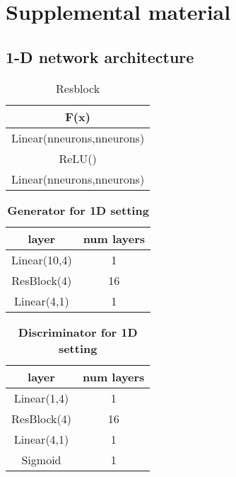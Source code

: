 
\section*{Supplemental material}

\subsection{1-D network architecture}

\begin{table}[ht]
\caption{Resblock} %
\centering %
\begin{tabular}{c} %
\hline\hline %
F(x)\\%
\hline %
Linear(nneurons,nneurons)\\ %
ReLU() \\
Linear(nneurons,nneurons) \\
\hline %
\end{tabular}
\label{table:resblock} %
\end{table}


\begin{table}[ht]
\caption{\textbf{Generator for 1D setting}} %
\centering %
\begin{tabular}{c c} %
\hline\hline %
layer & num layers\\%
\hline %
Linear(10,4) & 1\\ %
ResBlock(4) & 16 \\
Linear(4,1) & 1 \\
\hline %
\end{tabular}
\label{table:1d_G} %
\end{table}

\begin{table}[ht]
\caption{\textbf{Discriminator for 1D setting}} %
\centering %
\begin{tabular}{c c} %
\hline\hline %
layer & num layers\\%
\hline %
Linear(1,4) & 1\\ %
ResBlock(4) & 16 \\
Linear(4,1) & 1 \\
Sigmoid & 1 \\
\hline %
\end{tabular}
\label{table:1d_D} %
\end{table}



